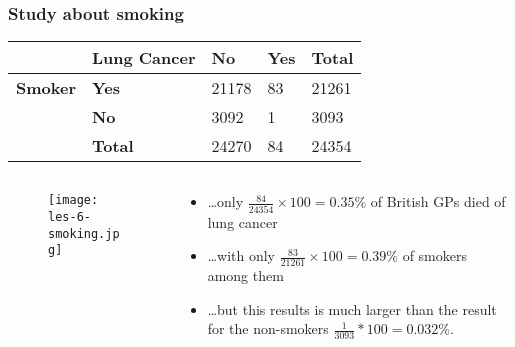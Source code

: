 \documentclass[aspectratio=169]{beamer}
\begin{document}
\begin{frame}
  \frametitle{Study about smoking}
  \begin{table}[h]
    \begin{tabular}{@{}lllll@{}}
      \toprule
      & \textbf{Lung Cancer} & \textbf{No} & \textbf{Yes} & \textbf{Total} \\ \midrule
      \textbf{Smoker} & \textbf{Yes}        & 21178         & 83           & 21261           \\
      & \textbf{No}         & 3092          & 1            & 3093            \\
      & \textbf{Total}      & 24270         & 84           & 24354           \\ \bottomrule
    \end{tabular}
  \end{table}
  
  \begin{columns}
    \begin{column}{0.3 \textwidth}
      
      \begin{figure}
        \centering
        \texttt{[image: les-6-smoking.jpg]}
      \end{figure}
      
    \end{column}
    \begin{column}{0.7 \textwidth}
      
      \begin{itemize}
        \item \dots only $\frac{84}{ 24354} \times 100 = 0.35\% $ of British GPs died of lung cancer
        \item \dots with only $\frac{83}{21261} \times 100 = 0.39\%$ of smokers among them
        \item \dots but this results is much larger than the result for the non-smokers $\frac{1}{3093} * 100 = 0.032\%$.
      \end{itemize}
    \end{column}
  \end{columns}
\end{frame}
\end{document}

